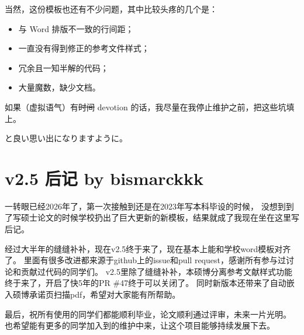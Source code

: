 当然，这份模板也还有不少问题，其中比较头疼的几个是：
\begin{itemize}
\item 与 Word 排版不一致的行间距；
\item 一直没有得到修正的参考文件样式；
\item 冗余且一知半解的代码；
\item 大量魔数，缺少文档。
\end{itemize}

如果（虚拟语气）有\sout{时间} devotion 的话，我尽量在我停止维护之前，把这些坑填上。

\nuaathesis{} と良い思い出になりますように。

\section{v2.5 后记 by bismarckkk}
一转眼已经2026年了，第一次接触到\nuaathesis 还是在2023年写本科毕设的时候，
没想到到了写硕士论文的时候学校扔出了巨大更新的新模板，结果就成了我现在坐在这里写后记。

经过大半年的缝缝补补，现在\nuaathesis v2.5终于来了，现在基本上能和学校word模板对齐了。
里面有很多改进都来源于github上的issue和pull request，感谢所有参与过讨论和贡献过代码的同学们。
v2.5里除了缝缝补补，本硕博分离参考文献样式功能终于来了，开启了快5年的PR \#47终于可以关闭了。
同时新版本还带来了自动嵌入硕博承诺页扫描pdf，希望对大家能有所帮助。


最后，祝所有使用\nuaathesis 的同学们都能顺利毕业，论文顺利通过评审，未来一片光明。
也希望能有更多的同学加入到\nuaathesis 的维护中来，让这个项目能够持续发展下去。

